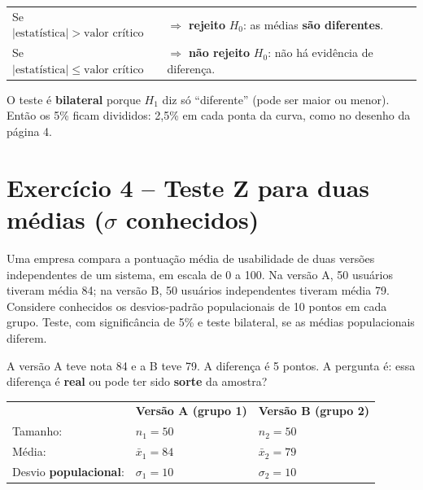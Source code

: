 \documentclass[12pt,a4paper]{article}
\begin{document}
\begin{center}
\begin{tabular}{ll}
\toprule
Se $|\text{estatística}| > \text{valor crítico}$ & $\Rightarrow$ \textbf{rejeito} $H_0$: as médias \textbf{são diferentes}. \\
Se $|\text{estatística}| \le \text{valor crítico}$ & $\Rightarrow$ \textbf{não rejeito} $H_0$: não há evidência de diferença. \\
\bottomrule
\end{tabular}
\end{center}

O teste é \textbf{bilateral} porque $H_1$ diz só ``diferente'' (pode ser maior ou menor). Então os 5\% ficam divididos: 2,5\% em cada ponta da curva, como no desenho da página 4.

\newpage
\section*{Exercício 4 -- Teste Z para duas médias ($\sigma$ conhecidos)}

\begin{enunciado}
Uma empresa compara a pontuação média de usabilidade de duas versões independentes de um sistema, em escala de 0 a 100. Na versão A, 50 usuários tiveram média 84; na versão B, 50 usuários independentes tiveram média 79. Considere conhecidos os desvios-padrão populacionais de 10 pontos em cada grupo. Teste, com significância de 5\% e teste bilateral, se as médias populacionais diferem.
\end{enunciado}

\begin{traducao}
A versão A teve nota 84 e a B teve 79. A diferença é 5 pontos. A pergunta é: essa diferença é \textbf{real} ou pode ter sido \textbf{sorte} da amostra?
\end{traducao}

\begin{dados}
\begin{tabular}{lll}
 & \textbf{Versão A (grupo 1)} & \textbf{Versão B (grupo 2)} \\
Tamanho: & $n_1 = 50$ & $n_2 = 50$ \\
Média: & $\bar{x}_1 = 84$ & $\bar{x}_2 = 79$ \\
Desvio \textbf{populacional}: & $\sigma_1 = 10$ & $\sigma_2 = 10$
\end{tabular}
\end{dados}
\end{document}
